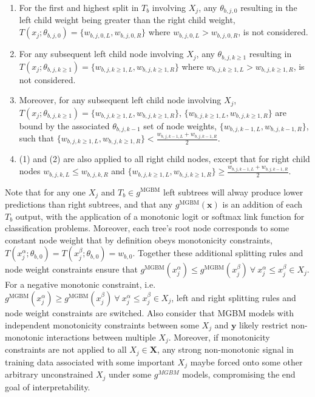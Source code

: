 \documentclass[information,article,submit,moreauthors,pdftex]{definitions/mdpi}
\begin{document}
\begin{enumerate}[leftmargin=*,labelsep=4.9mm]
\item For the first and highest split in $T_b$ involving $X_j$, any $\theta_{b,j,0}$ resulting in the left child weight being greater than the right child weight, $T(x_j; \theta_{b,j,0}) = \{w_{b,j,0,L}, w_{b,j,0,R}\}$ where $w_{b,j,0,L} > w_{b,j,0,R}$, is not considered. 
\item For any subsequent left child node involving $X_j$, any $\theta_{b,j, k\ge1}$ resulting in $T(x_j; \theta_{b,j,k\ge1}) = \{w_{b,j,k\ge1,L}, w_{b,j,k\ge1,R}\}$ where $w_{b,j,k\ge1,L} > w_{b,j,k\ge1,R}$, is not considered.
\item Moreover, for any subsequent left child node involving $X_j$, $T(x_j; \theta_{b,j,k\ge1}) = \{w_{b,j,k\ge1,L}, w_{b,j,k\ge1,R}\}$, $\{w_{b,j,k\ge1,L}, w_{b,j,k\ge1,R}\}$ are bound by the associated $\theta_{b,j,k-1}$ set of node weights, $\{w_{b,j,k-1,L}, w_{b,j,k-1, R}\}$, such that $ \{w_{b,j,k\ge1,L}, w_{b,j,k\ge1,R}\} < \frac{w_{b,j,k-1,L} + w_{b,j,k-1,R}}{2}$.
\item (1) and (2) are also applied to all right child nodes, except that for right child nodes $ w_{b,j,k,L} \le w_{b,j,k,R}$ and $\{w_{b,j,k\ge1,L}, w_{b,j,k\ge1,R}\} \ge \frac{w_{b,j,k-1,L} + w_{b,j,k-1,R}}{2}$.
\end{enumerate}

\noindent Note that for any one $X_j$ and $T_b \in g^{\text{MGBM}}$ left subtrees will alway produce lower predictions than right subtrees, and that any $g^{\text{MGBM}}(\mathbf{x})$ is an addition of each $T_b$ output, with the application of a monotonic logit or softmax link function for classification problems. Moreover, each tree's root node corresponds to some constant node weight that by definition obeys monotonicity constraints, $ T(x^{\alpha}_j; \theta_{b,0}) = T(x^{\beta}_j; \theta_{b,0}) = w_{b,0}$. Together these additional splitting rules and node weight constraints ensure that $g^{\text{MGBM}}(x^{\alpha}_j)  \le g^{\text{MGBM}}(x^{\beta}_j) ~\forall ~x^{\alpha}_j \le x^{\beta}_j \in X_j$. For a negative monotonic constraint, i.e. $g^{\text{MGBM}}(x^{\alpha}_j)  \ge g^{\text{MGBM}}(x^{\beta}_j) ~\forall ~x^{\alpha}_j \le x^{\beta}_j \in X_j$, left and right splitting rules and node weight constraints are switched. Also consider that MGBM models with independent monotonicity constraints between some $X_j$ and $\mathbf{y}$ likely restrict non-monotonic interactions between multiple $X_j$. Moreover, if monotonicity constraints are not applied to all $X_j \in \mathbf{X}$, any strong non-monotonic signal in training data associated with some important $X_j$ maybe forced onto some other arbitrary unconstrained $X_j$ under some $g^{MGBM}$ models, compromising the end goal of interpretability.
\end{document}
